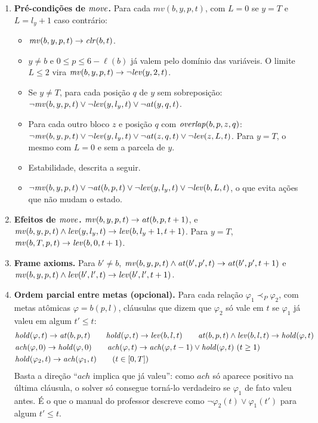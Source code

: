\begin{enumerate}
\item \textbf{Pré-condições de $\mathit{move}$.} Para cada $\mathit{mv}(b,y,p,t)$, com $L=0$ se $y=T$ e $L=l_y+1$ caso contrário:
\begin{itemize}
\item[(P1)] $\mathit{mv}(b,y,p,t)\rightarrow\mathit{clr}(b,t)$.
\item[(P2)] $y\neq b$ e $0\le p\le 6-\ell(b)$ já valem pelo domínio das variáveis. O limite $L\le 2$ vira $\mathit{mv}(b,y,p,t)\rightarrow\neg\mathit{lev}(y,2,t)$.
\item[(P3)] Se $y\neq T$, para cada posição $q$ de $y$ sem sobreposição: $\neg\mathit{mv}(b,y,p,t)\lor\neg\mathit{lev}(y,l_y,t)\lor\neg\mathit{at}(y,q,t)$.
\item[(P4)] Para cada outro bloco $z$ e posição $q$ com $\mathit{overlap}(b,p,z,q)$: $\neg\mathit{mv}(b,y,p,t)\lor\neg\mathit{lev}(y,l_y,t)\lor\neg\mathit{at}(z,q,t)\lor\neg\mathit{lev}(z,L,t)$. Para $y=T$, o mesmo com $L=0$ e sem a parcela de $y$.
\item[(P5)] Estabilidade, descrita a seguir.
\item[(P6)] $\neg\mathit{mv}(b,y,p,t)\lor\neg\mathit{at}(b,p,t)\lor\neg\mathit{lev}(y,l_y,t)\lor\neg\mathit{lev}(b,L,t)$, o que evita ações que não mudam o estado.
\end{itemize}
\item \textbf{Efeitos de $\mathit{move}$.} $\mathit{mv}(b,y,p,t)\rightarrow\mathit{at}(b,p,t+1)$, e $\mathit{mv}(b,y,p,t)\land\mathit{lev}(y,l_y,t)\rightarrow\mathit{lev}(b,l_y+1,t+1)$. Para $y=T$, $\mathit{mv}(b,T,p,t)\rightarrow\mathit{lev}(b,0,t+1)$.
\item \textbf{Frame axioms.} Para $b'\neq b$, $\mathit{mv}(b,y,p,t)\land\mathit{at}(b',p',t)\rightarrow\mathit{at}(b',p',t+1)$ e $\mathit{mv}(b,y,p,t)\land\mathit{lev}(b',l',t)\rightarrow\mathit{lev}(b',l',t+1)$.
\item \textbf{Ordem parcial entre metas (opcional).} Para cada relação $\varphi_1\prec_P\varphi_2$, com metas atômicas $\varphi=b(p,l)$, cláusulas que dizem que $\varphi_2$ só vale em $t$ se $\varphi_1$ já valeu em algum $t'\le t$:
\begin{align*}
&\mathit{hold}(\varphi,t)\rightarrow\At(b,p,t) \qquad \mathit{hold}(\varphi,t)\rightarrow\Lev(b,l,t) \qquad \At(b,p,t)\land\Lev(b,l,t)\rightarrow\mathit{hold}(\varphi,t)\\
&\mathit{ach}(\varphi,0)\rightarrow\mathit{hold}(\varphi,0) \qquad \mathit{ach}(\varphi,t)\rightarrow\mathit{ach}(\varphi,t-1)\lor\mathit{hold}(\varphi,t)\ (t\ge 1)\\
&\mathit{hold}(\varphi_2,t)\rightarrow\mathit{ach}(\varphi_1,t)\qquad(t\in[0,T])
\end{align*}
Basta a direção ``$\mathit{ach}$ implica que já valeu'': como $\mathit{ach}$ só aparece positivo na última cláusula, o solver só consegue torná-lo verdadeiro se $\varphi_1$ de fato valeu antes. É o que o manual do professor descreve como $\neg\varphi_2(t)\lor\varphi_1(t')$ para algum $t'\le t$.
\end{enumerate}

